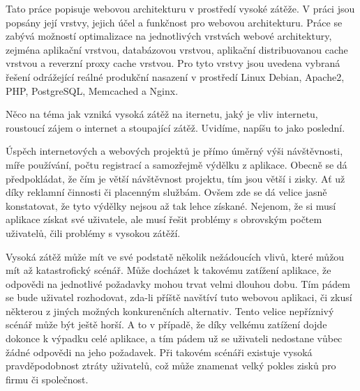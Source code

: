 \documentclass[12pt]{article}
\begin{document}
\pagestyle{headings}





{Tato práce popisuje webovou architekturu v prostředí vysoké zátěže. V práci jsou popsány její vrstvy, jejich účel a funkčnost pro webovou architekturu. Práce se zabývá možností optimalizace na jednotlivých vrstvách webové architektury, zejména aplikační vrstvou, databázovou vrstvou, aplikační distribuovanou cache vrstvou a reverzní proxy cache vrstvou. Pro tyto vrstvy jsou uvedena vybraná řešení odrážející reálné produkční nasazení v prostředí Linux Debian, Apache2, PHP, PostgreSQL, Memcached a Nginx.}


\obsah
{}


Něco na téma jak vzniká vysoká zátěž na iternetu, jaký je vliv internetu, roustoucí zájem o internet a stoupající zátěž. Uvidíme, napíšu to jako poslední.


Úspěch internetových a webových projektů je přímo úměrný výši návštěvnosti, míře používání, počtu registrací a samozřejmě výdělku z aplikace. Obecně se dá předpokládat, že čím je větší návštěvnost projektu, tím jsou větší i zisky. Ať už díky reklamní činnosti či placenným službám. Ovšem zde se dá velice jasně konstatovat, že tyto výdělky nejsou až tak lehce získané. Nejenom, že si musí aplikace získat své uživatele, ale musí řešit problémy s obrovským počtem uživatelů, čili problémy s vysokou zátěží.

Vysoká zátěž může mít ve své podstatě několik nežádoucích vlivů, které můžou mít až katastrofický scénář. Může docházet k takovému zatížení aplikace, že odpovědi na jednotlivé požadavky mohou trvat velmi dlouhou dobu. Tím pádem se bude uživatel rozhodovat, zda-li příště navštíví tuto webovou aplikaci, či zkusí některou z jiných možných konkurenčních alternativ. Tento velice nepříznivý scénář může být ještě horší. A to v případě, že díky velkému zatížení dojde dokonce k výpadku celé aplikace, a tím pádem už se uživateli nedostane vůbec žádné odpovědi na jeho požadavek. Při takovém scénáři existuje vysoká pravděpodobnost ztráty uživatelů, což může znamenat velký pokles zisků pro firmu či společnost.
\end{document}
